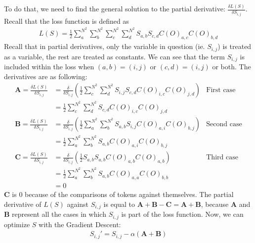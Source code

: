 To do that, we need to find the general solution to the partial derivative: $ \frac{\delta L(S)}{\delta S_{i,j}}$. Recall that the loss function is defined as
\begin{align*}
    L(S)=\frac{1}{2}\sum_{a}^{N^2} \sum_{b}^{N^2} \sum_{c}^{N^2} \sum_{d}^{N^2} S_{a,b} S_{c,d} C(O)_{a,c}C(O)_{b,d}
\end{align*}
Recall that in partial derivatives, only the variable in question (ie. $S_{i,j}$) is treated as a variable, the rest are treated as constants. We can see that the term $S_{i,j}$ is included within the loss when $(a,b)=(i,j)$ or $(c,d)=(i,j)$ or both. The derivatives are as following:
\begin{align*}
        \bm{A}=\frac{\delta L(S)}{\delta S_{i,j}}&=\frac{\delta}{\delta S_{i,j}}\left(\frac{1}{2}\sum_{c}^{N^2} \sum_{d}^{N^2} S_{i,j} S_{c,d} C(O)_{i,c}C(O)_{j,d}\right)&\text{First case}\\
              &=\frac{1}{2}\sum_{c}^{N^2} \sum_{d}^{N^2} S_{c,d} C(O)_{i,c}C(O)_{j,d}&\\
        \bm{B}=\frac{\delta L(S)}{\delta S_{i,j}}&=\frac{\delta}{\delta S_{i,j}}\left(\frac{1}{2}\sum_{a}^{N^2} \sum_{b}^{N^2} S_{a,b} S_{i,j} C(O)_{a,i}C(O)_{b,j}\right)&\text{Second case}\\
              &=\frac{1}{2}\sum_{a}^{N^2} \sum_{b}^{N^2} S_{a,b} C(O)_{a,i}C(O)_{b,j}&\\
        \bm{C}=\frac{\delta L(S)}{\delta S_{i,j}}&=\frac{\delta}{\delta S_{i,j}}\left(\frac{1}{2}S_{a,b} S_{a,b} C(O)_{a,b}C(O)_{a,b}\right)&\text{Third case}\\
              &=\frac{1}{2}\sum_{a}^{N^2} \sum_{b}^{N^2} S_{a,b} C(O)_{a,a}C(O)_{b,b}&\\
              &=0&
\end{align*}
$\bm{C}$ is $0$ because of the comparisons of tokens against themselves. The partial derivative of $L(S)$ against $S_{i,j}$ is equal to $\bm{A}+\bm{B}-\bm{C}=\bm{A}+\bm{B}$, because $\bm{A}$ and $\bm{B}$ represent all the cases in which $S_{i,j}$ is part of the loss function. Now, we can optimize $S$ with the Gradient Descent:
\begin{align*}
        S_{i,j}'=S_{i,j}-\alpha \left(\bm{A}+\bm{B}\right)
\end{align*}

